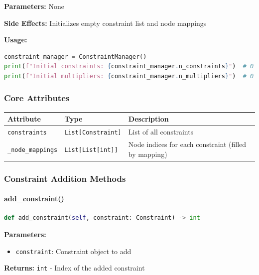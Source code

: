 \textbf{Parameters:} None

\textbf{Side Effects:} Initializes empty constraint list and node mappings

\textbf{Usage:}
\begin{lstlisting}[language=Python, caption=ConstraintManager Constructor Usage]
constraint_manager = ConstraintManager()
print(f"Initial constraints: {constraint_manager.n_constraints}")  # 0
print(f"Initial multipliers: {constraint_manager.n_multipliers}")  # 0
\end{lstlisting}

\subsubsection{Core Attributes}

\begin{longtable}{|p{3.2cm}|p{3cm}|p{7cm}|}
\hline
\textbf{Attribute} & \textbf{Type} & \textbf{Description} \\
\hline
\endhead

\texttt{constraints} & \texttt{List[Constraint]} & List of all constraints \\
\hline

\texttt{\_node\_mappings} & \texttt{List[List[int]]} & Node indices for each constraint (filled by mapping) \\
\hline

\end{longtable}

\subsubsection{Constraint Addition Methods}

\paragraph{add\_constraint()}\leavevmode
\begin{lstlisting}[language=Python, caption=Add Constraint Method]
def add_constraint(self, constraint: Constraint) -> int
\end{lstlisting}

\textbf{Parameters:}
\begin{itemize}
    \item \texttt{constraint}: Constraint object to add
\end{itemize}

\textbf{Returns:} \texttt{int} - Index of the added constraint

